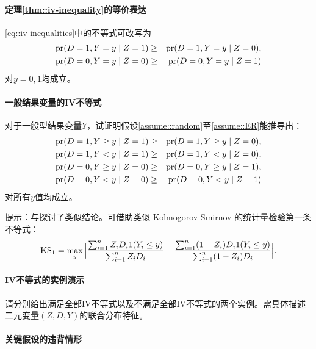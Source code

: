  





\paragraph{定理\ref{thm::iv-inequality}的等价表达}
\label{hw::ivineq-binary}

\eqref{eq::iv-inequalities}中的不等式可改写为\begin{eqnarray*}
\textup{pr}(D=1, Y=y\mid Z=1) &\geq & \textup{pr}(D=1, Y=y\mid Z=0), \\
\textup{pr}(D=0, Y=y\mid Z=0) &\geq & \textup{pr}(D=0, Y=y\mid Z=1)
\end{eqnarray*}对$y=0,1$均成立。 



\paragraph{一般结果变量的IV不等式}
\label{hw::ivineq-general-Y}

对于一般型结果变量$Y$，试证明假设\ref{assume::random}至\ref{assume::ER}能推导出：
\begin{eqnarray*}
\textup{pr}(D=1, Y\geq y\mid Z=1) &\geq & \textup{pr}(D=1, Y\geq y\mid Z=0), \\
\textup{pr}(D=1, Y <  y\mid Z=1) &\geq & \textup{pr}(D=1, Y <  y\mid Z=0), \\
\textup{pr}(D=0, Y\geq y\mid Z=0) &\geq & \textup{pr}(D=0, Y\geq y\mid Z=1),\\
\textup{pr}(D=0, Y <  y\mid Z=0) &\geq & \textup{pr}(D=0, Y <  y\mid Z=1)
\end{eqnarray*}
对所有$y$值均成立。 
 
提示：\citet{imbens1997estimating}与\citet{kitagawa2015test}探讨了类似结论。可借助类似 Kolmogorov-Smirnov 的统计量检验第一条不等式：
$$
\text{KS}_1 = \max_{y} \Big |
\frac{  \sum_{i=1}^n Z_i D_i  1(Y_i \leq y)  }{ \sum_{i=1}^n Z_i D_i  } - \frac{  \sum_{i=1}^n (1-Z_i) D_i  1(Y_i \leq y)  }{ \sum_{i=1}^n (1-Z_i) D_i  }
\Big |.
$$



\paragraph{IV不等式的实例演示}

请分别给出满足全部IV不等式以及不满足全部IV不等式的两个实例。需具体描述二元变量$(Z,D,Y)$的联合分布特征。 

 
 
 \paragraph{关键假设的违背情形}\label{eq::violations-of-IV}


